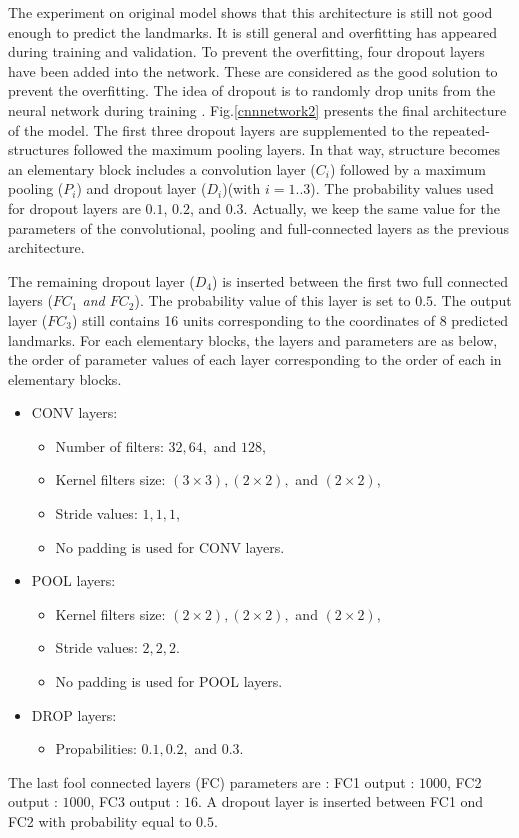 \documentclass[10pt]{article}
\begin{document}
The experiment on original model shows that this architecture is still
not good enough to predict the landmarks. It is still general and
overfitting has appeared during training and validation.
To prevent the overfitting, four dropout layers have been added into
the network. These are considered as the good solution to prevent the
overfitting. The idea of dropout is to randomly drop units from the
neural network during training
\cite{srivastava2014dropout}. Fig.\ref{cnnnetwork2} presents the final
architecture of the model. The first three dropout layers are
supplemented to the repeated-structures followed the maximum pooling
layers. In that way, structure becomes an elementary block includes a
convolution layer (\textit{$C_i$}) followed by a maximum pooling
(\textit{$P_i$}) and dropout layer (\textit{$D_i$})(with
$i=1..3$). The probability values used for dropout layers are $0.1$,
$0.2$, and $0.3$. Actually, we keep the same value for the parameters
of the convolutional, pooling and full-connected layers as the
previous architecture.

The remaining dropout layer (\textit{$D_4$}) is inserted between the first
two full connected layers (\textit{$FC_1$ and $FC_2$}). The probability value of this layer
is set to $0.5$. The output layer (\textit{$FC_3$}) still contains 16
units corresponding to the coordinates of 8 predicted landmarks.
For each elementary blocks, the layers and parameters are as below, the order of parameter values of each layer corresponding to the order of each in elementary blocks.

\begin{itemize}[nosep,label=\footnotesize$\bullet$]

\item CONV layers:
		\begin{itemize}[nosep]
			\item Number of filters: $32, 64,$ and $128$,
			\item Kernel filters size: $(3 \times 3), (2 \times 2),$ and $(2 \times 2)$,
			\item Stride values: $1, 1, 1$,
			\item No padding is used for CONV layers.
		\end{itemize}			
	\item POOL layers:
		\begin{itemize}[nosep]
			\item Kernel filters size: $(2 \times 2), (2 \times 2),$ and $(2 \times 2)$,
			\item Stride values: $2, 2, 2$.
			\item No padding is used for POOL layers.
		\end{itemize}
	\item DROP layers: 
		\begin{itemize}[nosep]
			\item Propabilities: $0.1, 0.2, $ and $0.3$.
		\end{itemize}
	\end{itemize}
The last fool connected layers (FC) parameters are : FC1 output :
$1000$, FC2 output : $1000$, FC3  output : $16$. A dropout layer is
inserted between FC1 ond FC2 with probability equal to $0.5$.
\end{document}
